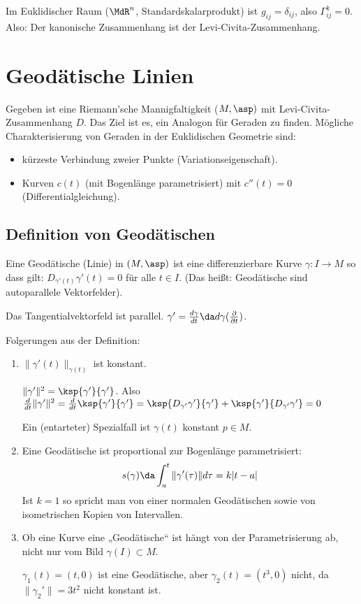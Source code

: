 \documentclass[a4paper,twoside,DIV15,BCOR12mm]{scrbook}
\begin{document}
\begin{beispiel}
Im Euklidischer Raum ($\MdR^n$, Standardskalarprodukt) ist $g_{ij}=\delta_{ij}$, also $\Gamma_{ij}^k = 0$. Also: Der kanonische Zusammenhang ist der Levi-Civita-Zusammenhang.
\end{beispiel}

\chapter{Geodätische Linien}

Gegeben ist eine Riemann’sche Mannigfaltigkeit ($M,\asp)$ mit Levi-Civita-Zusammenhang $D$. Das Ziel ist es, ein Analogon für Geraden zu finden. Mögliche Charakterisierung von Geraden in der Euklidischen Geometrie sind:
\begin{itemize}
\item kürzeste Verbindung zweier Punkte (Variationseigenschaft).
\item Kurven $c(t)$ (mit Bogenlänge parametrisiert) mit $c''(t)=0$ (Differentialgleichung).
\end{itemize}

\section{Definition von Geodätischen}

Eine Geodätische (Linie) in $(M,\asp)$ ist eine differenzierbare Kurve $\gamma: I \to M$ so dass gilt: $D_{\gamma'(t)}\gamma'(t) = 0$ für alle $t\in I$. (Das heißt: Geodätische sind autoparallele Vektorfelder).

Das Tangentialvektorfeld ist parallel. $\gamma' = \frac {d\gamma}{dt} \da d\gamma(\frac\partial{\partial t})$.

Folgerungen aus der Definition:
\begin{enumerate}
\item $\|\gamma'(t)\|_{\gamma(t)}$ ist konstant.

\begin{beweis}
$\|\gamma'\|^2 = \ksp {\gamma'}{\gamma'}$. Also $\frac d{dt} \|\gamma'\|^2 = \frac d{dt} \ksp {\gamma'}{\gamma'} = \ksp{D_{\gamma'}\gamma'}{\gamma'} + \ksp {\gamma'}{D_{\gamma'}\gamma'} = 0$
\end{beweis}
Ein (entarteter) Spezialfall ist $\gamma(t)$ konstant $p\in M$.
\item Eine Geodätische ist proportional zur Bogenlänge parametrisiert:
\[
s(\gamma) \da \int_a^t \|\gamma'(\tau)\| d\tau = k |t-a|
\]
Ist $k=1$ so spricht man von einer normalen Geodätischen sowie von isometrischen Kopien von Intervallen.
\item Ob eine Kurve eine „Geodätische“ ist hängt von der Parametrisierung ab, nicht nur vom Bild $\gamma(I)\subset M$.
\begin{beispiel}
$\gamma_1(t) = (t,0)$ ist eine Geodätische, aber $\gamma_2(t) = (t^3,0)$ nicht, da $\|\gamma_2'\|=3t^2$ nicht konstant ist.
\end{beispiel}
\end{enumerate}
\end{document}
